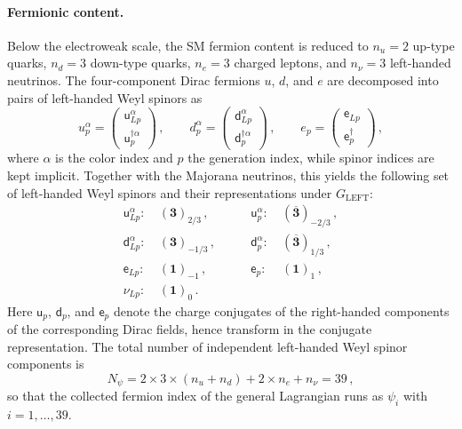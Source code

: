 \paragraph{Fermionic content.}
Below the electroweak scale, the SM fermion content is reduced to $n_u=2$ up-type quarks, $n_d=3$ down-type quarks, $n_e=3$ charged leptons, and $n_\nu=3$ left-handed neutrinos. The four-component Dirac fermions $u$, $d$, and $e$ are decomposed into pairs of left-handed Weyl spinors as
\begin{equation}\label{eq:LEFT_fermion_decomp}
    u_p^\alpha = \begin{pmatrix} \mathsf{u}_{Lp}^\alpha \\ \mathsf{u}_p^{\dagger\alpha} \end{pmatrix}
    \,,\qquad 
    d_p^\alpha = \begin{pmatrix} \mathsf{d}_{Lp}^\alpha \\ \mathsf{d}_p^{\dagger\alpha} \end{pmatrix}
    \,,\qquad 
    e_p = \begin{pmatrix} \mathsf{e}_{Lp} \\ \mathsf{e}_p^\dagger \end{pmatrix}\,,
\end{equation}
where $\alpha$ is the color index and $p$ the generation index, while spinor indices are kept implicit. Together with the Majorana neutrinos, this yields the following set of left-handed Weyl spinors and their representations under $G_{\text{LEFT}}$:
\begin{equation}\label{eq:LEFT_fermions}
    \begin{aligned}
        \mathsf{u}_{Lp}^\alpha:& \ (\mathbf{3})_{2/3}\,,\qquad
        & \mathsf{u}_{p}^\alpha:& \ (\overline{\mathbf{3}})_{-2/3}\,,\\
        \mathsf{d}_{Lp}^\alpha:& \ (\mathbf{3})_{-1/3}\,,\qquad
        & \mathsf{d}_{p}^\alpha:& \ (\overline{\mathbf{3}})_{1/3}\,,\\
        \mathsf{e}_{Lp}:& \ (\mathbf{1})_{-1}\,,\qquad
        & \mathsf{e}_{p}:& \ (\mathbf{1})_{1}\,,\\
        \mathsf{\nu}_{Lp}:& \ (\mathbf{1})_{0}\,. & &
    \end{aligned}
\end{equation}
Here $\mathsf{u}_p$, $\mathsf{d}_p$, and $\mathsf{e}_p$ denote the charge conjugates of the right-handed components of the corresponding Dirac fields, hence transform in the conjugate representation. The total number of independent left-handed Weyl spinor components is
\begin{equation}
    N_\psi = 2\times 3\times(n_u + n_d) + 2\times n_e + n_\nu  = 39\,,
\end{equation}
so that the collected fermion index of the general Lagrangian runs as $\psi_i$ with $i=1,\dotsc,39$.

